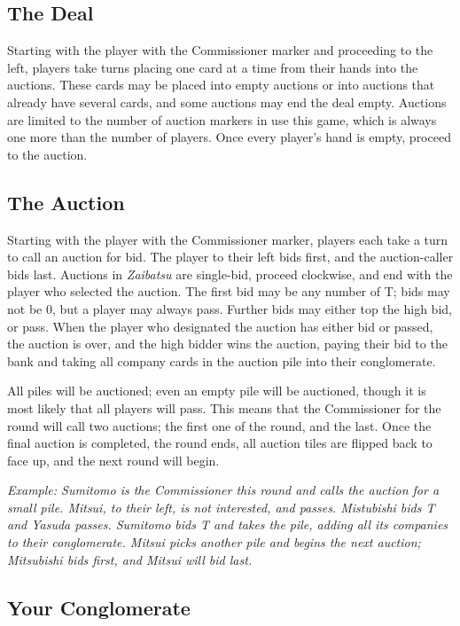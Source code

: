 \documentclass[]{article}
\newcommand{\tyen}{T\textyen}
\begin{document}
\subsection*{The Deal}

Starting with the player with the Commissioner marker and proceeding to the
left, players take turns placing one card at a time from their hands into the
auctions. These cards may be placed into empty auctions or into auctions that
already have several cards, and some auctions may end the deal empty. Auctions
are limited to the number of auction markers in use this game, which is always
one more than the number of players. Once every player's hand is empty, proceed
to the auction.

\subsection*{The Auction}

Starting with the player with the Commissioner marker, players each take a turn
to call an auction for bid. The player to their left bids first, and the
auction-caller bids last. Auctions in \emph{Zaibatsu} are single-bid, proceed
clockwise, and end with the player who selected the auction. The first bid may
be any number of \tyen ; bids may not be 0, but a player may always pass.
Further bids may either top the high bid, or pass. When the player who
designated the auction has either bid or passed, the auction is over, and the
high bidder wins the auction, paying their bid to the bank and taking all
company cards in the auction pile into their conglomerate.

All piles will be auctioned; even an empty pile will be auctioned, though it is
most likely that all players will pass. This means that the Commissioner for the
round will call two auctions; the first one of the round, and the last. Once the
final auction is completed, the round ends, all auction tiles are flipped back
to face up, and the next round will begin. 

\indent\textit{Example: Sumitomo is the Commissioner this round and calls the
auction for a small pile. Mitsui, to their left, is not interested, and passes.
Mistubishi bids \tyen 4 and Yasuda passes. Sumitomo bids \tyen 5 and takes the
pile, adding all its companies to their conglomerate. Mitsui picks another pile
and begins the next auction; Mitsubishi bids first, and Mitsui will bid last.}

\subsection*{Your Conglomerate}
\end{document}
